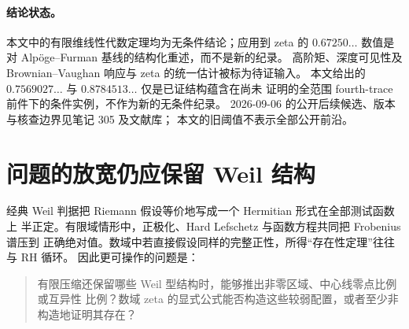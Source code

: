 \documentclass[UTF8,11pt,a4paper]{ctexart}
\theoremstyle{definition}
\theoremstyle{remark}
\begin{document}
\begin{abstract}
Weil 显式公式和函数方程已经构造数域上的矩阵及符号块；当前素数侧二阶矩给出
Riemann zeta 与本原 Dirichlet $L$ 函数的历史 $0.67250\ldots$ 简单中心线比例。
进一步改进不必先证明完整四矩渐近：在平窗二矩下，只需把中心四矩一侧压到
$0.3275499\ldots$ 以下即可超过该历史基线；更高公开候选须另作比较。
本文把这一目标进一步分成 $2+2,3+1,4+0$ 素数共振族
和背景/taper/Gamma 余项的净预算。弱紧致性和凸分离可把“所有有限问题一致可解”
提升为非构造的全局响应，但不能凭空产生所需的一致算术预算。
本文进一步把 Archimedean 背景约化为零频 Toeplitz 主部，并用判别式一致的
shifted-sieve 上界排空全部非零 mixed frequencies。在额外的 pure-prime
全范围有符号四阶预算成立这一未证前件下，每个长度
$X/\sqrt{\log X}$ 的高度窗都含有一个 centered fourth trace 受确定性对角常数
控制的点；Montgomery--Taylor 窗对应常数为 $0.2525089687\ldots$。本文证明
moving-start zero-block transfer：起点偏移 $T/\sqrt{\log T}$ 只改变 $o(N)$
个零点，故相对稠密的好高度足以传回固定 dyadic 与累计计数。形式代入四矩惯性
证书给简单/互异比例 $0.7569027\ldots/0.8784513\ldots$；这两个记录级数值仍
标为条件性：fixed-power high-product 的实际合并有符号四阶预算仍未证明，
其他 prime-side 依赖也须按范围继续复核。当前已通过的逆审计
包括 Bettin--Chandee/Henriot 外部输入及十二条 cyclic paired paths 的常数重建。
\end{abstract}

\paragraph{结论状态。}
本文中的有限维线性代数定理均为无条件结论；应用到 zeta 的
$0.67250\ldots$ 数值是对 Alpöge--Furman 基线的结构化重述，而不是新的纪录。
高阶矩、深度可见性及 Brownian--Vaughan 响应与 zeta 的统一估计被标为待证输入。
本文给出的 $0.7569027\ldots$ 与 $0.8784513\ldots$ 仅是已证结构蕴含在尚未
证明的全范围 fourth-trace 前件下的条件实例，不作为新的无条件纪录。
2026-09-06 的公开后续候选、版本与核查边界见笔记 305 及文献库；
本文的旧阈值不表示全部公开前沿。

\section{问题的放宽仍应保留 Weil 结构}

经典 Weil 判据把 Riemann 假设等价地写成一个 Hermitian 形式在全部测试函数上
半正定。有限域情形中，正极化、Hard Lefschetz 与函数方程共同把 Frobenius 谱压到
正确绝对值。数域中若直接假设同样的完整正性，所得“存在性定理”往往与 RH 循环。
因此更可操作的问题是：
\begin{quote}
有限压缩还保留哪些 Weil 型结构时，能够推出非零区域、中心线零点比例或互异性
比例？数域 zeta 的显式公式能否构造这些较弱配置，或者至少非构造地证明其存在？
\end{quote}
\end{document}
